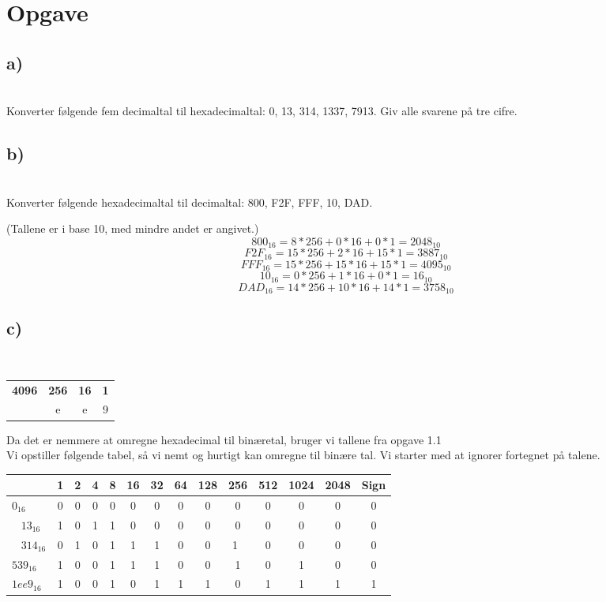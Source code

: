 \documentclass[a4,11pt]{article}
\newcommand{\tb}[1]{\textbf{#1}\\}
\begin{document}
\section{Opgave}

\subsection{a)}
\tb{}

Konverter følgende fem decimaltal til hexadecimaltal: 0, 13, 314, 1337, 7913. Giv alle svarene på tre cifre.




\subsection{b)}
\tb{}

Konverter følgende hexadecimaltal til decimaltal: 800, F2F, FFF, 10, DAD. 

(Tallene er i base 10, med mindre andet er angivet.)
$$ 800_{16} = 8*256 + 0 * 16 + 0 * 1 = 2048_{10}$$
$$ F2F_{16} = 15 * 256 + 2 * 16 + 15 * 1 = 3887_{10}$$
$$ FFF_{16} = 15 * 256 + 15 * 16 + 15 * 1 = 4095_{10}$$
$$ 10_{16} = 0* 256 + 1 * 16 + 0 * 1 = 16_{10}$$
$$ DAD_{16} = 14 * 256 + 10 * 16 + 14 * 1 = 3758_{10}$$

\subsection{c)}
\tb{}

\begin{center}
  \begin{tabular}{| c | c | c | c |}
    \hline
     \textbf{4096} & \textbf{256} & \textbf{16} & \textbf{1}\\ \hline
    1 & e & e & 9\\
    \hline
  \end{tabular}
\end{center}

Da det er nemmere at omregne hexadecimal til binæretal, bruger vi tallene fra opgave 1.1\\
Vi opstiller følgende tabel, så vi nemt og hurtigt kan omregne til binære tal. Vi starter med at ignorer fortegnet på talene.
\begin{center}
  \begin{tabular}{ | l | c | c | c |  c |  c |  c |  c |  c |  c |  c |  c |  c |  c | }
    \hline
    & 1 & 2 & 4 & 8 & 16 & 32 & 64 & 128 & 256 & 512 & 1024 & 2048 & Sign\\ \hline
    $0_{16}$ &        0 & 0 & 0 & 0 & 0 & 0 & 0 & 0 & 0 & 0 & 0 & 0 & 0 \\ \hline
    $13_{16}$ &      1 & 0 & 1 & 1 & 0 & 0 & 0 & 0 & 0 & 0 & 0 & 0 & 0 \\ \hline
    $314_{16}$ &    0 & 1 &0 & 1 & 1 & 1 & 0 & 0 & 1 & 0 & 0 & 0 & 0 \\ \hline
    $539_{16}$ &    1 & 0 & 0 & 1 & 1 & 1 & 0 & 0 &1 & 0 & 1 & 0 & 0 \\ \hline
    $1ee9_{16}$ & 1 & 0 & 0 & 1 & 0 & 1 & 1 & 1 & 0 & 1 & 1 & 1 & 1 \\
    \hline
  \end{tabular}
\end{center}
\end{document}
